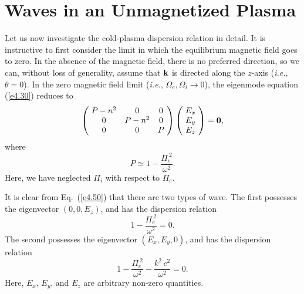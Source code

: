 \section{Waves in an Unmagnetized Plasma}\label{s4.7}
Let us now investigate the cold-plasma dispersion relation in detail. It is
instructive to first consider the limit in which the equilibrium magnetic
field goes to zero. In the absence of the magnetic field, there is
no preferred direction, so we can, without loss of generality,
assume that ${\bf k}$ is directed along the $z$-axis ({\em i.e.}, $\theta=0$).
In the zero magnetic field limit ({\em i.e.}, ${\Omega}_e, {\Omega}_i
\rightarrow 0$), the eigenmode equation  (\ref{e4.30}) reduces to
\begin{equation}\label{e4.50}
\left(\!\begin{array}{ccc}
P-n^2 & 0 & 0\\
0 & P-n^2 & 0 \\
0 & 0 & P\end{array}\! \right)\left(\!\begin{array}{c} E_x\\E_y\\ E_z\end{array}
\!\right) = {\bf 0},
\end{equation}
where
\begin{equation}
P \simeq 1 - \frac{{\Pi}_e^{~2}}{\omega^2}.
\end{equation}
Here, we have neglected ${\Pi}_i$ with respect to ${\Pi}_e$. 

It is clear from Eq.~(\ref{e4.50}) that there are two types of wave.
The first possesses
the eigenvector $(0,0,E_z)$, and has the dispersion relation
\begin{equation}
 1- \frac{{\Pi}_e^{~2}}{\omega^2} = 0.
\end{equation}
The second possesses the eigenvector $(E_x, E_y, 0)$, and has the dispersion
relation
\begin{equation}\label{e4.53}
1 - \frac{ {\Pi}_e^{~2}}{\omega^2} - \frac{k^2\,c^2}{\omega^2} = 0.
\end{equation}
Here, $E_x$, $E_y$, and $E_z$ are arbitrary non-zero quantities. 

